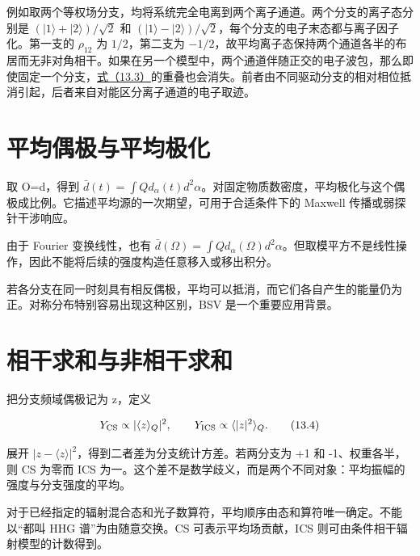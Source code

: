 \documentclass[UTF8,a4paper,zihao=-4,openany,fontset=fandol]{ctexbook}
\begin{document}
例如取两个等权场分支，均将系统完全电离到两个离子通道。两个分支的离子态分别是 $(|1\rangle+|2\rangle)/\sqrt2$ 和 $(|1\rangle-|2\rangle)/\sqrt2$，每个分支的电子末态都与离子因子化。第一支的 $\rho_{12}$ 为 $1/2$，第二支为 $-1/2$，故平均离子态保持两个通道各半的布居而无非对角相干。如果在另一个模型中，两个通道伴随正交的电子波包，那么即使固定一个分支，\hyperref[eq:13.3]{式（13.3）}的重叠也会消失。前者由不同驱动分支的相对相位抵消引起，后者来自对能区分离子通道的电子取迹。



\section{平均偶极与平均极化}\label{sec:13:5}


取 O=d，得到 $\bar d(t)=\int Qd_\alpha(t)d^2\alpha$。对固定物质数密度，平均极化与这个偶极成比例。它描述平均源的一次期望，可用于合适条件下的 Maxwell 传播或弱探针干涉响应。



由于 Fourier 变换线性，也有 $\bar d(\Omega)=\int Qd_\alpha(\Omega)d^2\alpha$。但取模平方不是线性操作，因此不能将后续的强度构造任意移入或移出积分。



若各分支在同一时刻具有相反偶极，平均可以抵消，而它们各自产生的能量仍为正。对称分布特别容易出现这种区别，BSV 是一个重要应用背景。



\section{相干求和与非相干求和}\label{sec:13:6}


把分支频域偶极记为 z，定义



\begin{equation*}
Y_{\rm CS}\propto|\langle z\rangle_Q|^2,
\qquad Y_{\rm ICS}\propto\langle|z|^2\rangle_Q.
\tag{13.4}\label{eq:13.4}
\end{equation*}


展开 $|z-\langle z\rangle|^2$，得到二者差为分支统计方差。若两分支为 +1 和 -1、权重各半，则 CS 为零而 ICS 为一。这个差不是数学歧义，而是两个不同对象：平均振幅的强度与分支强度的平均。



对于已经指定的辐射混合态和光子数算符，平均顺序由态和算符唯一确定。不能以“都叫 HHG 谱”为由随意交换。CS 可表示平均场贡献，ICS 则可由条件相干辐射模型的计数得到。
\end{document}
